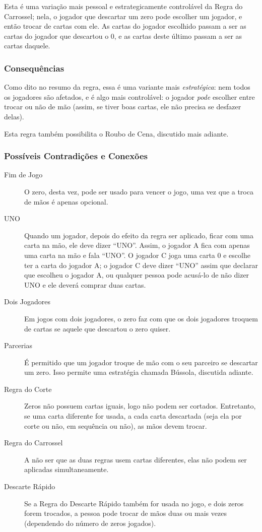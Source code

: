 Esta é uma variação mais pessoal e estrategicamente controlável da Regra do Carrossel; nela, o jogador que descartar um zero pode escolher um jogador, e então trocar de cartas com ele. As cartas do jogador escolhido passam a ser as cartas do jogador que descartou o 0, e as cartas deste último passam a ser as cartas daquele.

\subsubsection{Consequências}

Como dito no resumo da regra, essa é uma variante mais \emph{estratégica}: nem todos os jogadores são afetados, e é algo mais controlável: o jogador \emph{pode} escolher entre trocar ou não de mão (assim, se tiver boas cartas, ele não precisa se desfazer delas).

Esta regra também possibilita o Roubo de Cena, discutido mais adiante.

\subsubsection{Possíveis Contradições e Conexões}

\begin{description}
\item[Fim de Jogo]{O zero, desta vez, pode ser usado para vencer o jogo, uma vez que a troca de mãos é apenas opcional.}
\item[UNO]{Quando um jogador, depois do efeito da regra ser aplicado, ficar com uma carta na mão, ele deve dizer ``UNO''. Assim, o jogador A fica com apenas uma carta na mão e fala ``UNO''. O jogador C joga uma carta 0 e escolhe ter a carta do jogador A; o jogador C deve dizer ``UNO'' assim que declarar que escolheu o jogador A, ou qualquer pessoa pode acusá-lo de não dizer UNO e ele deverá comprar duas cartas.}
\item[Dois Jogadores]{Em jogos com dois jogadores, o zero faz com que os dois jogadores troquem de cartas se aquele que descartou o zero quiser.}
\item[Parcerias]{É permitido que um jogador troque de mão com o seu parceiro se descartar um zero. Isso permite uma estratégia chamada Bússola, discutida adiante.}
\item[Regra do Corte]{Zeros não possuem cartas iguais, logo não podem ser cortados. Entretanto, se uma carta diferente for usada, a cada carta descartada (seja ela por corte ou não, em sequência ou não), as mãos devem trocar.}
\item[Regra do Carrossel]{A não ser que as duas regras usem cartas diferentes, elas não podem ser aplicadas simultaneamente.}
\item[Descarte Rápido]{Se a Regra do Descarte Rápido também for usada no jogo, e dois zeros forem trocados, a pessoa pode trocar de mãos duas ou mais vezes (dependendo do número de zeros jogados).}
\end{description}

